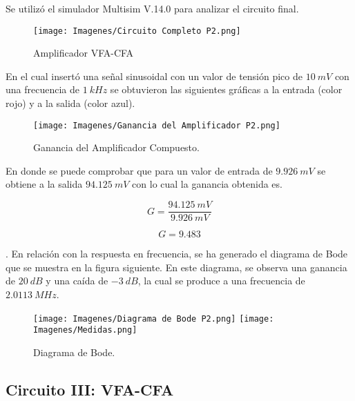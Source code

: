 \documentclass[12pt,A4paper,titlepage]{article}
\begin{document}
\hspace{1mm} Se utilizó el simulador Multisim V.14.0 para analizar el circuito final.

\begin{figure}[!h]
    \centering
    \texttt{[image: Imagenes/Circuito Completo P2.png]}
    \caption{Amplificador VFA-CFA}
    
\end{figure}
    
\hspace{1mm} En el cual insertó una señal sinusoidal con un valor de tensión pico de \(10~mV\) con una frecuencia de \( 1~kHz \) se obtuvieron las siguientes gráficas a la entrada (color rojo) y a la salida (color azul).

\begin{figure}[!h]
    \centering
    \texttt{[image: Imagenes/Ganancia del Amplificador P2.png]}
    \caption{Ganancia del Amplificador Compuesto.}
\end{figure}

\hspace{1mm} En donde se puede comprobar que para un valor de entrada de \( 9.926~mV \) se obtiene a la salida \( 94.125~mV \) con lo cual la ganancia obtenida es.

\begin{equation}
    G = \frac{94.125~mV}{9.926~mV}
\end{equation}

\begin{equation}
    \boxed{
    G = 9.483
    }
\end{equation}

.\hspace{1mm} En relación con la respuesta en frecuencia, se ha generado el diagrama de Bode que se muestra en la figura siguiente. En este diagrama, se observa una ganancia de \(20~dB\) y una caída de \(-3~dB\), la cual se produce a una frecuencia de \(2.0113~MHz\).

\newpage
\begin{figure}[!h]
    \centering
    \texttt{[image: Imagenes/Diagrama de Bode P2.png]}
    \texttt{[image: Imagenes/Medidas.png]}
    \caption{Diagrama de Bode.}
\end{figure}








\newpage
\subsection{Circuito III: VFA-CFA}
\end{document}

